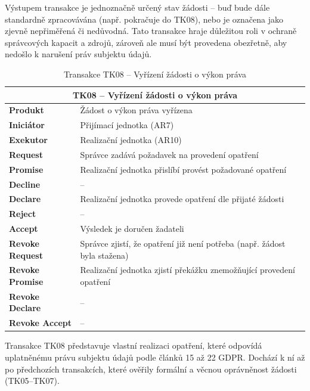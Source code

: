 \begin{itemize}
  Výstupem transakce je jednoznačně určený stav žádosti – buď bude dále standardně zpracovávána (např. pokračuje do TK08), nebo je označena jako zjevně nepřiměřená či nedůvodná. Tato transakce hraje důležitou roli v ochraně správcových kapacit a zdrojů, zároveň ale musí být provedena obezřetně, aby nedošlo k narušení práv subjektu údajů.


  \begin{table}[H]
    \centering
    \renewcommand{\arraystretch}{1.2}
    \begin{tabular}{|p{3.1cm}|p{9.9cm}|}
    \hline
    \multicolumn{2}{|c|}{\textbf{TK08 – Vyřízení žádosti o výkon práva}} \\
    \hline
    \textbf{Produkt} & Žádost o výkon práva vyřízena \\
    \hline
    \textbf{Iniciátor} & Přijímací jednotka (AR7) \\
    \hline
    \textbf{Exekutor} & Realizační jednotka (AR10) \\
    \hline 
    \textbf{Request} & Správce zadává požadavek na provedení opatření \\
    \hline
    \textbf{Promise} & Realizační jednotka přislíbí provést požadované opatření \\
    \hline
    \textbf{Decline} & – \\
    \hline
    \textbf{Declare} & Realizační jednotka provede opatření dle přijaté žádosti \\
    \hline
    \textbf{Reject} & – \\
    \hline
    \textbf{Accept} & Výsledek je doručen žadateli  \\
    \hline
    \textbf{Revoke Request} & Správce zjistí, že opatření již není potřeba (např. žádost byla stažena) \\
    \hline
    \textbf{Revoke Promise} & Realizační jednotka zjistí překážku znemožňující provedení opatření \\
    \hline
    \textbf{Revoke Declare} & – \\
    \hline
    \textbf{Revoke Accept} & – \\
    \hline
    \end{tabular}
    \caption{Transakce TK08 – Vyřízení žádosti o výkon práva}
  \end{table}

  Transakce TK08 představuje vlastní realizaci opatření, které odpovídá uplatněnému právu subjektu údajů podle článků 15 až 22 GDPR. Dochází k ní až po předchozích transakcích, které ověřily formální a věcnou oprávněnost žádosti (TK05–TK07).


\end{itemize}
